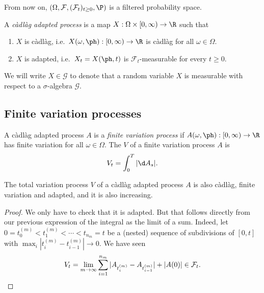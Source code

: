 \documentclass[a4paper]{article}
\begin{document}
From now on, $(\Omega, \mathcal{F}, (\mathcal{F}_t)_{t \geq 0}, \P)$ is a filtered probability space.

\begin{defi}
  A \emph{c\`adl\`ag adapted process} is a map $X: \Omega \times [0, \infty) \to \R$ such that
  \begin{enumerate}
    \item $X$ is c\`adl\`ag, i.e.\ $X(\omega, \ph): [0, \infty) \to \R$ is c\`adl\`ag for all $\omega \in \Omega$.
    \item $X$ is adapted, i.e.\ $X_t = X(\ph, t) $ is $\mathcal{F}_t$-measurable for every $t \geq 0$.
  \end{enumerate}
\end{defi}

\begin{notation}
  We will write $X \in \mathcal{G}$ to denote that a random variable $X$ is measurable with respect to a $\sigma$-algebra $\mathcal{G}$.
\end{notation}

\subsection{Finite variation processes}
\begin{defi}
  A c\`adl\`ag adapted process $A$ is a \emph{finite variation process} if $A(\omega, \ph): [0, \infty) \to \R$ has finite variation for all $\omega \in \Omega$. The  $V$ of a finite variation process $A$ is
  \[
    V_t = \int_0^T |\d A_s|.
  \]
\end{defi}

\begin{prop}
  The total variation process $V$ of a c\`adl\`ag adapted process $A$ is also c\`adl\`ag, finite variation and adapted, and it is also increasing.
\end{prop}

\begin{proof}
  We only have to check that it is adapted. But that follows directly from our previous expression of the integral as the limit of a sum. Indeed, let $0 = t_0^{(m)} < t_1^{(m)} < \cdots < t_{n_m} = t$ be a (nested) sequence of subdivisions of $[0, t]$ with $\max_i |t_i^{(m)} - t_{i - 1}^{(m)}| \to 0$. We have seen
  \[
    V_t = \lim_{m \to \infty} \sum_{i = 1}^{n_m} |A_{t_i^{(m)}} - A_{t_{i - 1}^{(m)}}| + |A(0)| \in \mathcal{F}_t.\qedhere
  \]
\end{proof}
\end{document}
